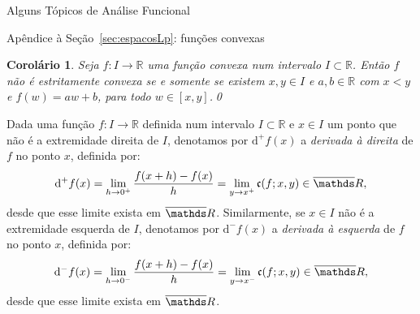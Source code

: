 \documentclass[oneside,final,11pt]{amsbook}
\newcommand{\R}{\mathds R}
\newcommand{\dd}{\mathrm d}
\newcommand{\ca}{\mathfrak c}
\theoremstyle{remark}\newtheorem{exercise}{Exercício}[chapter]
\theoremstyle{remark}\newtheorem{*exercise}[exercise]{\hbox to 0pt{\hskip 0pt minus 1fil*}Exercício}
\theoremstyle{definition}\newtheorem{exdefin}{Definição}[chapter]
\theoremstyle{plain}\newtheorem{teo}{Teorema}[section]
\theoremstyle{plain}\newtheorem{lem}[teo]{Lema}
\theoremstyle{plain}\newtheorem{prop}[teo]{Proposição}
\theoremstyle{plain}\newtheorem{cor}[teo]{Corolário}
\theoremstyle{definition}\newtheorem{defin}[teo]{Definição}
\theoremstyle{remark}\newtheorem{rem}[teo]{Observação}
\theoremstyle{definition}\newtheorem{notation}[teo]{Notação}
\theoremstyle{definition}\newtheorem{convention}[teo]{Convenção}
\theoremstyle{definition}\newtheorem{example}[teo]{Exemplo}
\numberwithin{section}{chapter}
\numberwithin{equation}{section}
\begin{document}
\begin{chapter}{Alguns Tópicos de Análise Funcional}
\begin{section}{Apêndice à Seção~\ref{sec:espacosLp}: funções convexas}
\begin{cor}\label{thm:convnotstrict}
Seja $f:I\to\R$ uma função convexa num intervalo $I\subset\R$. Então $f$ não é estritamente convexa se e somente se
existem $x,y\in I$ e $a,b\in\R$ com $x<y$ e $f(w)=aw+b$, para todo $w\in[x,y]$.\qed
\end{cor}

Dada uma função $f:I\to\R$ definida num intervalo $I\subset\R$ e $x\in I$ um ponto que não é a extremidade direita de $I$,
denotamos por $\dd^+f(x)$ a {\em derivada à direita\/} de $f$ no ponto $x$,
definida por:\index[simbolos]{$\dd^+f(x)$}
\[\dd^+f(x)=\lim_{h\to0^+}\frac{f(x+h)-f(x)}h=\lim_{y\to x^+}\ca(f;x,y)\in\overline\R,\]
desde que esse limite exista em $\overline\R$. Similarmente, se $x\in I$ não é a extremidade esquerda de $I$, denotamos por $\dd^-f(x)$
a {\em derivada à esquerda\/} de $f$ no ponto $x$,
definida por:\index[simbolos]{$\dd^-f(x)$}
\[\dd^-f(x)=\lim_{h\to0^-}\frac{f(x+h)-f(x)}h=\lim_{y\to x^-}\ca(f;x,y)\in\overline\R,\]
desde que esse limite exista em $\overline\R$.


\end{section}
\end{chapter}
\end{document}
